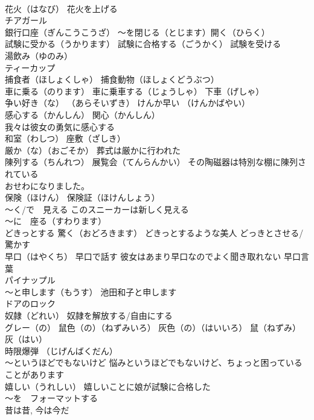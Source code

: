 \documentclass[8pt]{extreport}
\begin{document}
\begin{CJK}{UTF8}{min}
\\	花火（はなび） 花火を上げる
\\	チアガール
\\	銀行口座（ぎんこうこうざ） ～を閉じる（とじます）開く（ひらく）
\\	試験に受かる（うかります） 試験に合格する（ごうかく） 試験を受ける
\\	湯飲み（ゆのみ）
\\	ティーカップ 
\\	捕食者（ほしょくしゃ） 捕食動物（ほしょくどうぶつ）
\\	車に乗る（のります） 車に乗車する（じょうしゃ） 下車（げしゃ）
\\	争い好き（な） （あらそいずき） けんか早い （けんかばやい）
\\	感心する（かんしん） 関心（かんしん）
\\	我々は彼女の勇気に感心する
\\	和室（わしつ） 座敷（ざしき）
\\	厳か（な）（おごそか） 葬式は厳かに行われた
\\	陳列する（ちんれつ） 展覧会（てんらんかい） その陶磁器は特別な棚に陳列されている
\\	おせわになりました。
\\	保険（ほけん） 保険証（ほけんしょう）
\\	～く/で　見える このスニーカーは新しく見える
\\	～に　座る（すわります）
\\	どきっとする 驚く（おどろきます） どきっとするような美人 どっきとさせる/驚かす
\\	早口（はやくち） 早口で話す 彼女はあまり早口なのでよく聞き取れない 早口言葉
\\	パイナップル
\\	～と申します（もうす） 池田和子と申します
\\	ドアのロック
\\	奴隷（どれい） 奴隷を解放する/自由にする
\\	グレー（の） 鼠色（の）（ねずみいろ） 灰色（の）（はいいろ） 鼠（ねずみ）
\\	灰（はい）
\\	時限爆弾 （じげんばくだん）
\\	～というほどでもないけど 悩みというほどでもないけど、ちょっと困っていることがあります
\\	嬉しい（うれしい） 嬉しいことに娘が試験に合格した
\\	～を　フォーマットする
\\	昔は昔, 今は今だ

\end{CJK}
\end{document}
